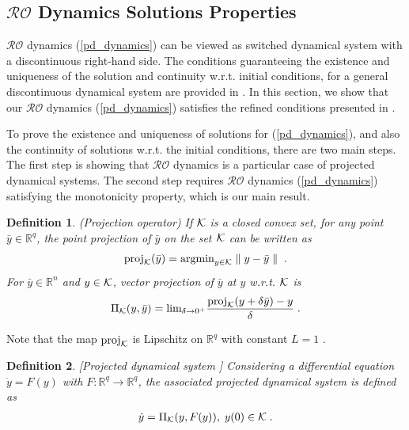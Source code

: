 \documentclass[journal,twoside,web]{ieeecolor}
\newtheorem{definition}{Definition}
\begin{document}
\subsection*{$\mathcal{RO}$ Dynamics Solutions Properties}\label{existence.sec}
$\mathcal{RO}$ dynamics (\ref{pd_dynamics}) can be viewed as switched dynamical system with a discontinuous right-hand side. The conditions guaranteeing the existence and uniqueness of the solution and continuity w.r.t. initial conditions, for a general discontinuous dynamical system are provided in \cite[Theorem~2.5]{nagurney2012projected}. In this section, we show that our $\mathcal{RO}$ dynamics (\ref{pd_dynamics}) satisfies the refined conditions presented in \cite{cherukuri2016}.

To prove the existence and uniqueness of solutions for (\ref{pd_dynamics}), and also the continuity of solutions w.r.t. the initial conditions, there are two main steps. The first step is showing that $\mathcal{RO}$ dynamics is a particular case of projected dynamical systems. The second step requires $\mathcal{RO}$ dynamics (\ref{pd_dynamics}) satisfying the monotonicity property, which is our main result.

\begin{definition} \label{projection_operator} (Projection operator)
If ${\cal K}$ is a closed convex set, for any point $\bar y \in \mathbb R^q$, the point projection of $\bar y$ on the set ${\cal K}$ can be written as
\begin{align*}
\text{proj}_{\cal K}(\bar y)=\text{argmin}_{y \in {\cal K}} \parallel y-\bar y \parallel\;.
\end{align*}
For $\bar y \in \mathbb R^n$ and $y \in {\cal K}$, vector projection of $\bar y$ at $y$ w.r.t. ${\cal K}$ is
\begin{align}
\label{projection_operator_eq}
\Pi_{\cal K}(y,\bar y) = \text{lim}_{\delta \rightarrow 0^+} \frac{\text{proj}_{\cal K}(y+\delta \bar y)-y}{\delta}\;.
\end{align}
\end{definition}

Note that the map $\text{proj}_{\cal K}$ is Lipschitz on $\mathbb R^q$ with constant $L=1$ \cite[Proposition~2.4.1]{clarke1983}.

\begin{definition} \label{projected_dynamical_system} [Projected dynamical system \cite{nagurney1996}]
Considering a differential equation $\dot y=F(y)$ with $F:\mathbb R^q \rightarrow \mathbb R^q$, the associated projected dynamical system is defined as
\begin{align}
\label{projected_dynamics}
\dot y = \Pi_{\cal K}(y,F(y)),\; y(0) \in {\cal K}\;.
\end{align}
\end{definition}
\end{document}
